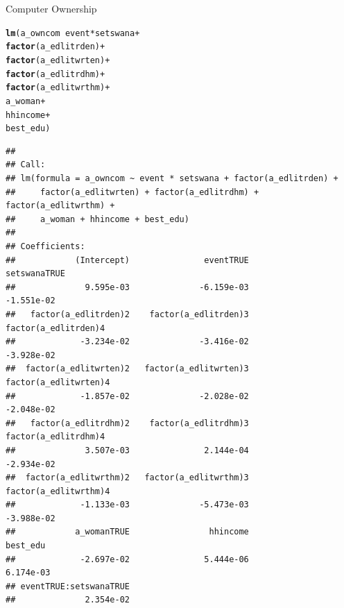 \documentclass[a4paper,british]{article}\usepackage[]{graphicx}\usepackage[]{xcolor}
\makeatletter
\newcommand{\hlopt}[1]{\textcolor[rgb]{0,0,0}{#1}}%
\newcommand{\hlstd}[1]{\textcolor[rgb]{0.345,0.345,0.345}{#1}}%
\newcommand{\hlkwd}[1]{\textcolor[rgb]{0.737,0.353,0.396}{\textbf{#1}}}%
\newenvironment{kframe}{%
 \def\at@end@of@kframe{}%
 \ifinner\ifhmode%
  \def\at@end@of@kframe{\end{minipage}}%
  \begin{minipage}{\columnwidth}%
 \fi\fi%
 \def\FrameCommand##1{\hskip\@totalleftmargin \hskip-\fboxsep
 \colorbox{shadecolor}{##1}\hskip-\fboxsep
     \hskip-\linewidth \hskip-\@totalleftmargin \hskip\columnwidth}%
 \MakeFramed {\advance\hsize-\width
   \@totalleftmargin\z@ \linewidth\hsize
   \@setminipage}}%
 {\par\unskip\endMakeFramed%
 \at@end@of@kframe}
\newenvironment{knitrout}{}{} %
\makeatother
\begin{document}
\begin{table}[H]
\caption{Computer Ownership}
\label{tab:owncom}

\begin{knitrout}
\color{fgcolor}\begin{kframe}
\begin{alltt}
\hlkwd{lm}\hlstd{(a_owncom} \hlopt{~} \hlstd{event}\hlopt{*}\hlstd{setswana}       \hlopt{+}
              \hlkwd{factor}\hlstd{(a_edlitrden)}  \hlopt{+}
              \hlkwd{factor}\hlstd{(a_edlitwrten)} \hlopt{+}
              \hlkwd{factor}\hlstd{(a_edlitrdhm)}  \hlopt{+}
              \hlkwd{factor}\hlstd{(a_edlitwrthm)} \hlopt{+}
              \hlstd{a_woman}              \hlopt{+}
              \hlstd{hhincome}             \hlopt{+}
              \hlstd{best_edu              )}
\end{alltt}
\begin{verbatim}
## 
## Call:
## lm(formula = a_owncom ~ event * setswana + factor(a_edlitrden) + 
##     factor(a_edlitwrten) + factor(a_edlitrdhm) + factor(a_edlitwrthm) + 
##     a_woman + hhincome + best_edu)
## 
## Coefficients:
##            (Intercept)               eventTRUE            setswanaTRUE  
##              9.595e-03              -6.159e-03              -1.551e-02  
##   factor(a_edlitrden)2    factor(a_edlitrden)3    factor(a_edlitrden)4  
##             -3.234e-02              -3.416e-02              -3.928e-02  
##  factor(a_edlitwrten)2   factor(a_edlitwrten)3   factor(a_edlitwrten)4  
##             -1.857e-02              -2.028e-02              -2.048e-02  
##   factor(a_edlitrdhm)2    factor(a_edlitrdhm)3    factor(a_edlitrdhm)4  
##              3.507e-03               2.144e-04              -2.934e-02  
##  factor(a_edlitwrthm)2   factor(a_edlitwrthm)3   factor(a_edlitwrthm)4  
##             -1.133e-03              -5.473e-03              -3.988e-02  
##            a_womanTRUE                hhincome                best_edu  
##             -2.697e-02               5.444e-06               6.174e-03  
## eventTRUE:setswanaTRUE  
##              2.354e-02
\end{verbatim}
\end{kframe}
\end{knitrout}
\end{table}
\end{document}
